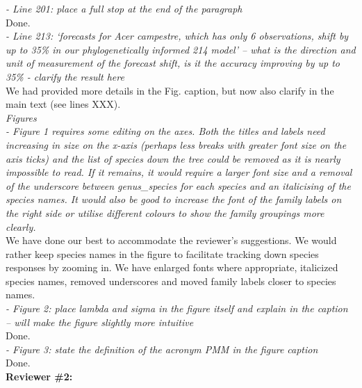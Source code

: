 \documentclass[11pt]{article}
\begin{document}
\emph{- Line 201: place a full stop at the end of the paragraph}\\
Done.\\

\emph{- Line 213: ‘forecasts for \emph{Acer campestre}, which has only 6 observations, shift by up to 35\% in our phylogenetically informed 214 model’ – what is the direction and unit of measurement of the forecast shift, is it the accuracy improving by up to 35\% - clarify the result here}\\
We had provided more details in the Fig. caption, but now also clarify in the main text (see lines XXX).\\


\emph{Figures}\\
\emph{- Figure 1 requires some editing on the axes. Both the titles and labels need increasing in size on the x-axis (perhaps less breaks with greater font size on the axis ticks) and the list of species down the tree could be removed as it is nearly impossible to read. If it remains, it would require a larger font size and a removal of the underscore between genus\_species for each species and an italicising of the species names. It would also be good to increase the font of the family labels on the right side or utilise different colours to show the family groupings more clearly.}\\
We have done our best to accommodate the reviewer's suggestions. We would rather keep species names in the figure to facilitate tracking down species responses by zooming in. We have enlarged fonts where appropriate, italicized species names, removed underscores and moved family labels closer to species names.\\

\emph{- Figure 2: place lambda and sigma in the figure itself and explain in the caption – will make the figure slightly more intuitive}\\
Done.\\

\emph{- Figure 3: state the definition of the acronym PMM in the figure caption}\\
Done.\\

{\bf Reviewer \#2:}\\
\end{document}
